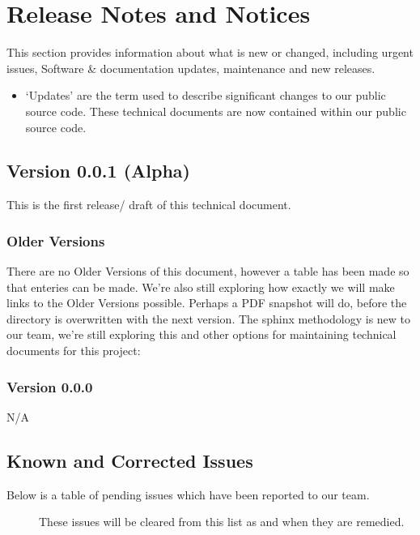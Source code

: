 \documentclass[letterpaper,10pt,english]{sphinxmanual}
\begin{document}
\section{Release Notes and Notices}
\label{\detokenize{releasenotes:release-notes-and-notices}}\label{\detokenize{releasenotes::doc}}
This section provides information about what is new or changed, including urgent issues, Software \& documentation updates, maintenance and new releases.
\begin{itemize}
\item {} 
‘Updates’ are the term used to describe significant changes to our public source code. These technical documents are now contained within our public source code.

\end{itemize}


\subsection{Version 0.0.1 (Alpha)}
\label{\detokenize{releasenotes:version-0-0-1-alpha}}
This is the first release/ draft of this technical document.


\subsubsection{Older Versions}
\label{\detokenize{releasenotes:older-versions}}
There are no Older Versions of this document, however a table has been made so that enteries can be made. We’re also still exploring how exactly we will make links to the Older Versions possible. Perhaps a PDF snapshot will do, before the directory is overwritten with the next version. The sphinx methodology is new to our team, we’re still exploring this and other options for maintaining technical documents for this project:


\subsubsection{Version 0.0.0}
\label{\detokenize{releasenotes:version-0-0-0}}
N/A


\subsection{Known and Corrected Issues}
\label{\detokenize{releasenotes:known-and-corrected-issues}}\begin{description}
\item[{Below is a table of pending issues which have been reported to our team.}] \leavevmode
These issues will be cleared from this list as and when they are remedied.

\end{description}
\end{document}

